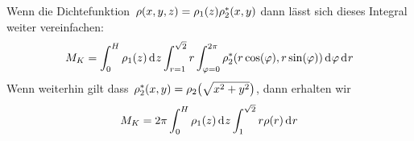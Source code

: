 \documentclass[../full]{subfiles}
\begin{document}

    Wenn die Dichtefunktion~\(
        \rho \paren{x, y, z} = \rho_1 \paren{z} \rho_2^* \paren{x, y}
    \) dann l\"asst sich dieses Integral weiter vereinfachen:
    \begin{equation*}
        M_K
        = \int_0^H \rho_1 \paren{z} \dx[z]
        \int_{r = 1}^{\sqrt{2}}
            r
            \int_{\varphi = 0}^{2 \pi}
                \rho_2^* \paren{
                    r \cos \paren{\varphi}, r \sin \paren{\varphi}
                }
            \dx[\varphi]
        \dx[r]
    \end{equation*}
    Wenn weiterhin gilt dass~\(
        \rho_2^* \paren{x, y} = \rho_2 \paren[\big]{\sqrt{x^2 + y^2}}
    \), dann erhalten wir
    \begin{equation*}
        M_K = 2 \pi \int_0^H \rho_1 \paren{z} \dx[z]
            \int_1^{\sqrt{2}} r \rho \paren{r} \dx[r]
    \end{equation*}


\end{document}
